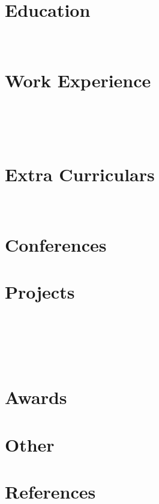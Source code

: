 \documentclass[a4paper,11pt]{article}
\begin{document}
\pagestyle{empty}



\section{Education}
 \\[-18pt]

\section{Work Experience}
 \\[5pt]
 \\[5pt]
 \\[5pt]

% 

\section{Extra Curriculars}
 \\[5pt]



\section{Conferences}



\newpage

\section{Projects}
 \\[5pt]
 \\[5pt]
 \\[5pt]
 \\[5pt]
 

% 
% 
% 
% 

% 

\section{Awards}


\section{Other}


\section{References}

\end{document}
